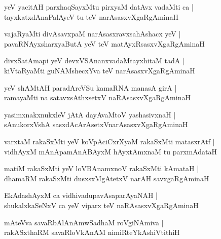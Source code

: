 \documentclass[twoside,12pt,openright]{book}
\newcounter{shloka}[chapter]
\begin{document}
\begin{shloka}%
yeV yacitAH parxhaqSayxMtu pirxyaM datAvx vadaMti ca |\\
tayxkatxdAnaPalAyeV tu teV narAsasxvXgaRgAminaH 
\end{shloka}

\begin{shloka}%
vajaRyaMti divAsavxpaM narAsasxravxsahAshacx yeV |\\
pavaRNAyxsharxyaButA yeV teV matAyxRsasxvXgaRgAminaH 
\end{shloka}

\begin{shloka}%
divxSatAmapi yeV devxVSAnanxvadaMtayxhitaM tadA |\\
kiVtaRyaMti guNAMshecxYva teV narAsasxvXgaRgAminaH 
\end{shloka}

\begin{shloka}%
yeV shAMtAH paradAreVSu kamaRNA manasA girA |\\
ramayaMti na satavxsAthxsetxV naRAsasxvXgaRgAminaH 
\end{shloka}

\begin{shloka}%
yasimxnakxnukxleV jAtA dayAvaMtoV yashasivxnaH |\\
sAnukorxVshA sasxdAcArAsetxVnarAsasxvXgaRgAminaH 
\end{shloka}

\begin{shloka}%
varxtaM rakaSxMti yeV koVpAciCxrXyaM rakaSxMti matasxrAtf |\\
vidhAyxM mAnApamAnABAyxM hAyxtAmxnaM  tu parxmAdataH 
\end{shloka}

\begin{shloka}%
matiM rakaSxMti yeV loVBAnamxnoV rakaSxMti kAmataH |\\
dhamaRM rakaSxMti dusxsxMgAtetxV narAH savxgaRgAminaH 
\end{shloka}

\begin{shloka}%
EkAdashAyxM ca vidhivadupavAsaparAyaNAH |\\
shukalxkaSeNxV ca yeV viparx teV naRAsasxvXgaRgAminaH 
\end{shloka}

\begin{shloka}%
mAteVva savaRbAlAnAmwSadhaM roVgiNAmiva |\\
rakASxthaRM savaRloVkAnAM nimiRteYkAshiVtithiH 
\end{shloka}
\end{document}
